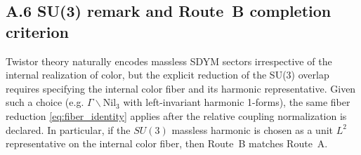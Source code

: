\documentclass[11pt]{article}
\begin{document}
\subsection{A.6 SU(3) remark and Route~B completion criterion}

Twistor theory naturally encodes massless SDYM sectors irrespective of the internal
realization of color, but the explicit reduction of the SU(3) overlap requires specifying
the internal color fiber and its harmonic representative.
Given such a choice (e.g. $\Gamma\backslash\mathrm{Nil}_3$ with left-invariant harmonic 1-forms),
the same fiber reduction \eqref{eq:fiber_identity} applies after the relative
coupling normalization is declared. In particular, if the $SU(3)$ massless harmonic is chosen as a unit
$L^2$ representative on the internal color fiber, then Route~B matches Route~A.
\end{document}
